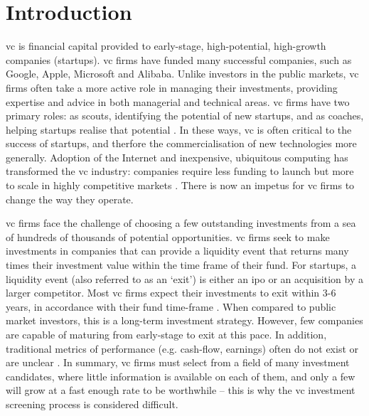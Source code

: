 \documentclass[../thesis/thesis.tex]{subfiles}
\begin{document}
\chapter{Introduction}
\label{chap:introduction}

\Gls{vc} is financial capital provided to early-stage, high-potential, high-growth companies (startups). \Gls{vc} firms have funded many successful companies, such as Google, Apple, Microsoft and Alibaba. Unlike investors in the public markets, \gls{vc} firms often take a more active role in managing their investments, providing expertise and advice in both managerial and technical areas. \Gls{vc} firms have two primary roles: as scouts, identifying the potential of new startups, and as coaches, helping startups realise that potential \cite{baum2004}. In these ways, \gls{vc} is often critical to the success of startups, and therfore the commercialisation of new technologies more generally. Adoption of the Internet and inexpensive, ubiquitous computing has transformed the \gls{vc} industry: companies require less funding to launch but more to scale in highly competitive markets \cite{graham2013}. There is now an impetus for \gls{vc} firms to change the way they operate.

\Gls{vc} firms face the challenge of choosing a few outstanding investments from a sea of hundreds of thousands of potential opportunities. \Gls{vc} firms seek to make investments in companies that can provide a liquidity event that returns many times their investment value within the time frame of their fund. For startups, a liquidity event (also referred to as an `exit') is either an \gls{ipo} or an acquisition by a larger competitor. Most \gls{vc} firms expect their investments to exit within 3-6 years, in accordance with their fund time-frame \cite{gompers1995}. When compared to public market investors, this is a long-term investment strategy. However, few companies are capable of maturing from early-stage to exit at this pace. In addition, traditional metrics of performance (e.g. cash-flow, earnings) often do not exist or are unclear \cite{shane2002}. In summary, \gls{vc} firms must select from a field of many investment candidates, where little information is available on each of them, and only a few will grow at a fast enough rate to be worthwhile  -- this is why the \gls{vc} investment screening process is considered difficult.
\end{document}
